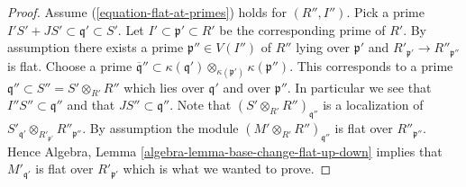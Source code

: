 \documentclass[10pt,a4paper]{amsart}
\theoremstyle{plain}
\theoremstyle{definition}
\theoremstyle{remark}
\numberwithin{equation}{subsection}
\begin{document}
\begin{proof}
Assume (\ref{equation-flat-at-primes}) holds for $(R'', I'')$. Pick a prime
$I'S' + JS' \subset \mathfrak q' \subset S'$. Let
$I' \subset \mathfrak p' \subset R'$ be the corresponding prime of $R'$.
By assumption there exists a prime $\mathfrak p'' \in V(I'')$ of $R''$
lying over $\mathfrak p'$ and $R'_{\mathfrak p'} \to R''_{\mathfrak p''}$
is flat. Choose a prime
$\overline{\mathfrak q}'' \subset
\kappa(\mathfrak q') \otimes_{\kappa(\mathfrak p')} \kappa(\mathfrak p'')$.
This corresponds to a prime $\mathfrak q'' \subset S'' = S' \otimes_{R'} R''$
which lies over $\mathfrak q'$ and over $\mathfrak p''$. In particular
we see that $I''S'' \subset \mathfrak q''$ and that
$JS'' \subset \mathfrak q''$. Note that
$(S' \otimes_{R'} R'')_{\mathfrak q''}$ is a localization of
$S'_{\mathfrak q'} \otimes_{R'_{\mathfrak p'}} R''_{\mathfrak p''}$.
By assumption the module $(M' \otimes_{R'} R'')_{\mathfrak q''}$ is
flat over $R''_{\mathfrak p''}$. Hence
Algebra, Lemma \ref{algebra-lemma-base-change-flat-up-down}
implies that $M'_{\mathfrak q'}$ is flat over $R'_{\mathfrak p'}$
which is what we wanted to prove.
\end{proof}
\end{document}
